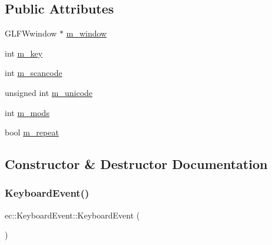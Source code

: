 \subsection*{Public Attributes}
\begin{DoxyCompactItemize}
\item 
G\+L\+F\+Wwindow $\ast$ \mbox{\hyperlink{structec_1_1_keyboard_event_a6de06c21e83612aeca727beedd93ae82}{m\+\_\+window}}
\item 
int \mbox{\hyperlink{structec_1_1_keyboard_event_a3748aaf86e02d8e2f458f5135edc9e3d}{m\+\_\+key}}
\item 
int \mbox{\hyperlink{structec_1_1_keyboard_event_a99de30a0a1504392405bbcfee3debd57}{m\+\_\+scancode}}
\item 
unsigned int \mbox{\hyperlink{structec_1_1_keyboard_event_a530cc03b6d62e8068694756426222909}{m\+\_\+unicode}}
\item 
int \mbox{\hyperlink{structec_1_1_keyboard_event_afd3db99c42980b15922c83d4bd0ccd5c}{m\+\_\+mods}}
\item 
bool \mbox{\hyperlink{structec_1_1_keyboard_event_ad9cc081843fb355f7f1b2a5d7b96b026}{m\+\_\+repeat}}
\end{DoxyCompactItemize}


\subsection{Constructor \& Destructor Documentation}
\mbox{\label{structec_1_1_keyboard_event_a7bec67ef8aff46a11e0472a73e9b6916}} 
\subsubsection{\texorpdfstring{Keyboard\+Event()}{KeyboardEvent()}\hspace{0.1cm}{\footnotesize\ttfamily [1/2]}}
{\footnotesize\ttfamily ec\+::\+Keyboard\+Event\+::\+Keyboard\+Event (\begin{DoxyParamCaption}{ }\end{DoxyParamCaption})\hspace{0.3cm}{\ttfamily [explicit]}}

\mbox{\label{structec_1_1_keyboard_event_a2914ab97f4705f779d630a4c1dbcf4b6}} 

